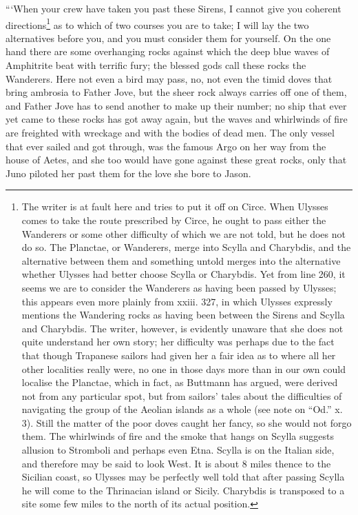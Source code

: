 “‘When your crew have taken you past these Sirens, I cannot give you coherent
directions\footnote{The writer is at fault here and tries to put it off on Circe. When Ulysses
comes to take the route prescribed by Circe, he ought to pass either the
Wanderers or some other difficulty of which we are not told, but he does not
do so. The Planctae, or Wanderers, merge into Scylla and Charybdis, and the
alternative between them and something untold merges into the alternative
whether Ulysses had better choose Scylla or Charybdis. Yet from line 260, it
seems we are to consider the Wanderers as having been passed by Ulysses; this
appears even more plainly from xxiii. 327, in which Ulysses expressly mentions
the Wandering rocks as having been between the Sirens and Scylla and
Charybdis. The writer, however, is evidently unaware that she does not quite
understand her own story; her difficulty was perhaps due to the fact that
though Trapanese sailors had given her a fair idea as to where all her other
localities really were, no one in those days more than in our own could
localise the Planctae, which in fact, as Buttmann has argued, were derived not
from any particular spot, but from sailors’ tales about the difficulties of
navigating the group of the Aeolian islands as a whole (see note on “Od.” x.
3). Still the matter of the poor doves caught her fancy, so she would not
forgo them. The whirlwinds of fire and the smoke that hangs on Scylla suggests
allusion to Stromboli and perhaps even Etna. Scylla is on the Italian side,
and therefore may be said to look West. It is about 8 miles thence to the
Sicilian coast, so Ulysses may be perfectly well told that after passing
Scylla he will come to the Thrinacian island or Sicily. Charybdis is
transposed to a site some few miles to the north of its actual position.}
as to which of two courses you are to take; I will lay the two alternatives
before you, and you must consider them for yourself. On the one hand there are
some overhanging rocks against which the deep blue waves of Amphitrite beat
with terrific fury; the blessed gods call these rocks the Wanderers. Here not
even a bird may pass, no, not even the timid doves that bring ambrosia to
Father Jove, but the sheer rock always carries off one of them, and Father Jove
has to send another to make up their number; no ship that ever yet came to
these rocks has got away again, but the waves and whirlwinds of fire are
freighted with wreckage and with the bodies of dead men. The only vessel that
ever sailed and got through, was the famous Argo on her way from the house of
Aetes, and she too would have gone against these great rocks, only that Juno
piloted her past them for the love she bore to Jason.

